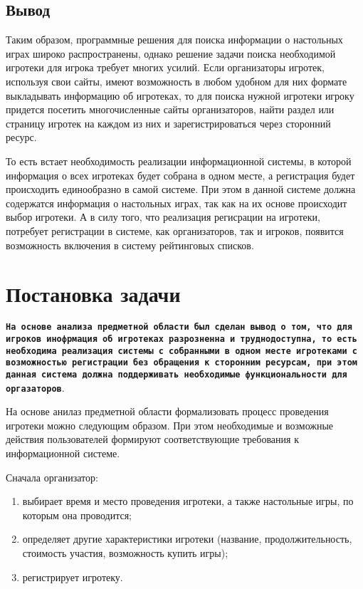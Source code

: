 \subsection*{Вывод}

Таким образом, программные решения для поиска информации о настольных играх
широко распространены, однако решение задачи поиска необходимой игротеки для
игрока требует многих усилий. Если организаторы игротек, используя свои сайты,
имеют возможность в любом удобном для них формате выкладывать информацию об
игротеках, то для поиска нужной игротеки игроку придется посетить многочисленные
сайты организаторов, найти раздел или страницу игротек на каждом из них и
зарегистрироваться через сторонний ресурс.

То есть встает необходимость реализации информационной системы, в которой
информация о всех игротеках будет собрана в одном месте, а регистрация будет
происходить единообразно в самой системе. При этом в данной системе должна
содержатся информация о настольных играх, так как на их основе происходит выбор
игротеки. А в силу того, что реализация регисрации на игротеки, потребует
регистрации в системе, как организаторов, так и игроков, появится возможность
включения в систему рейтинговых списков.

\section{Постановка задачи}

\texttt{\textbf{На основе анализа предметной области был сделан вывод о том, что
        для игроков инофрмация об игротеках разрозненна и труднодоступна, то
        есть необходима реализация системы с собранными в одном месте игротеками
        с возможностью регистрации без обращения к сторонним ресурсам, при этом
        данная система должна поддерживать необходимые функциональности для
        оргазаторов}}.

На основе анилаз предметной области формализовать процесс проведения игротеки
можно следующим образом. При этом необходимые и возможные действия
пользователей формируют соответствующие требования к информационной
системе.

Сначала организатор:
\begin{enumerate}[label=\arabic*)]
    \item выбирает время и место проведения игротеки, а также настольные игры,
      по которым она проводится;
    \item определяет другие характеристики игротеки (название,
        продолжительность, стоимость участия, возможность купить игры);
    \item регистрирует игротеку.
\end{enumerate}

